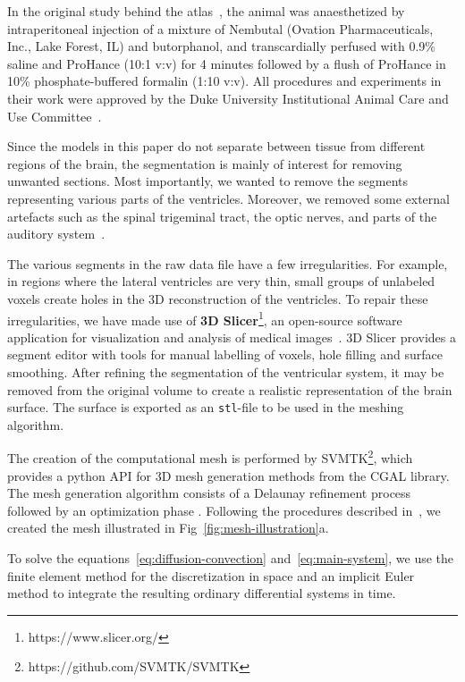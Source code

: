 \documentclass[a4paper,11pt]{article}
\newcommand{\1}{^{(1)}}
\newcommand{\2}{^{(2)}}
\begin{document}
In the original study behind the atlas~\cite{papp2014}, the animal was anaesthetized by intraperitoneal injection of a mixture of Nembutal (Ovation Pharmaceuticals, Inc., Lake Forest, IL) and butorphanol, and transcardially perfused with 0.9\% saline and ProHance (10:1 v:v) for 4 minutes followed by a flush of ProHance in 10\% phosphate-buffered formalin (1:10 v:v). All procedures and experiments in their work were approved by the Duke University Institutional Animal Care and Use Committee~\cite{papp2014}.

Since the models in this paper do not separate between tissue from different regions of the brain, the segmentation is mainly of interest for removing unwanted sections. Most importantly, we wanted to remove the segments representing various parts of the ventricles. Moreover, we removed some external artefacts such as the spinal trigeminal tract, the optic nerves, and parts of the auditory system~\cite{atlasv3}.

The various segments in the raw data file have a few irregularities. For example, in regions where the lateral ventricles are very thin, small groups of unlabeled voxels create holes in the 3D reconstruction of the ventricles. To repair these irregularities, we have made use of \textbf{3D Slicer}\footnote{https://www.slicer.org/}, an open-source software application for visualization and analysis of medical images~\cite{fedorov2012}. 3D Slicer provides a segment editor with tools for manual labelling of voxels, hole filling and surface smoothing. After refining the segmentation of the ventricular system, it may be removed from the original volume to create a realistic representation of the brain surface. The surface is exported as an \texttt{stl}-file to be used in the meshing algorithm.  

The creation of the computational mesh is performed by SVMTK\footnote{https://github.com/SVMTK/SVMTK}, which provides a python API for 3D mesh generation methods from the CGAL library. The mesh generation algorithm consists of a Delaunay refinement process followed by an optimization phase \cite{cgal:rty-m3-22a}. Following the procedures described in~\cite{Mardal-2022-mri}, we created the mesh illustrated in Fig~\ref{fig:mesh-illustration}a.

To solve the equations~\eqref{eq:diffusion-convection} and~\eqref{eq:main-system}, we use the finite element method for the discretization in space and an implicit Euler method to integrate the resulting ordinary differential systems in time. 
\end{document}
